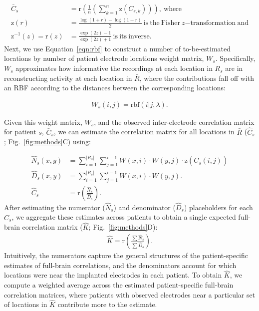 \documentclass[11pt]{article}
\begin{document}
\begin{align}
  \bar{C}_{s} &=
  \mathrm{r}(\frac{1}{n}(\sum_{k=1}^{n}\mathrm{z}(C_{s,k}))),\label{eqn:inter_corr}~\mathrm{where}\\
\mathrm{z}(r) &= \frac{\log(1+r) - \log(1 - r)}{2}~\mathrm{is~the~Fisher}~z \mathrm{-transformation~and}\label{eqn:fishersz}\\
\mathrm{z}^{-1}(z) = \mathrm{r}(z) &= \frac{\exp(2z) - 1}{\exp(2z) + 1}\mathrm{~is~its~inverse}.\label{eqn:invfishersz}
\end{align}
Next, we use Equation~\ref{eqn:rbf} to construct a number of
to-be-estimated locations by number of patient electrode locations
weight matrix, $W_s$.  Specifically, $W_s$ approximates how informative the
recordings at each location in $R_s$ are in reconstructing activity at
each location in $\bar{R}$, where the contributions fall off with an RBF according to
the distances between the corresponding locations:

\begin{align}
W_s(i, j) = \mathrm{rbf}(i|j,\lambda)\label{eqn:weight_matrix}.
\end{align}

Given this weight matrix, $W_s$,
and the observed inter-electrode correlation matrix for patient $s$,
$\bar{C}_{s}$, we can estimate the correlation matrix for all locations in
$\bar{R}$ ($\hat{C}_s$; Fig.~\ref{fig:methods}C) using:

\begin{align}
\hat{N}_{s}(x,y) & = { \sum_{i = 1}^{| R_{s}|}\sum_{j=1}^{i-1} W(x,i) \cdot W(y,j)\cdot \mathrm{z}(\bar{C}_{s}(i,j))}\label{eqn:subj_corrmat_num}\\
 \hat{D}_{s}(x,y) & = \sum_{i = 1}^{| R_{s}|}\sum_{j=1}^{i-1} W(x,i)
                    \cdot W(y,j). \label{eqn:subj_corrmat_den}\\
 \hat{C}_s &= \mathrm{r}\left( \frac{\hat{N}_{s}}{\hat{D}_{s}} \right)
             \label{eqn:subj_corrmat}.
\end{align}
After estimating the numerator ($\hat{N}_{s}$) and denominator
($\hat{D}_{s}$) placeholders for each $\hat{C}_{s}$, we aggregate these
estimates across patients to obtain a single expected full-brain
correlation matrix ($\hat{K}$; Fig.~\ref{fig:methods}D):
\begin{align}
 \hat{K} = \mathrm{r} \left(  \frac{\sum  \hat{N}_{s}}{\sum \hat{D}_{s}}\right).\label{eqn:corrmat}
\end{align}
Intuitively, the numerators capture the general structures of the
patient-specific estimates of full-brain correlations, and the
denominators account for which locations were near the implanted
electrodes in each patient.  To obtain $\hat{K}$, we compute a
weighted average across the estimated patient-specific full-brain
correlation matrices, where patients with observed electrodes near a
particular set of locations in $\hat{K}$ contribute more to the
estimate.
\end{document}

